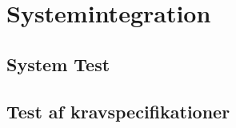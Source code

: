 \documentclass[../main.tex]{subfiles}
\begin{document}
\chapter{Systemintegration} \label{Chap:Systemintegration}
\section{System Test}
\section{Test af kravspecifikationer}
\end{document}
